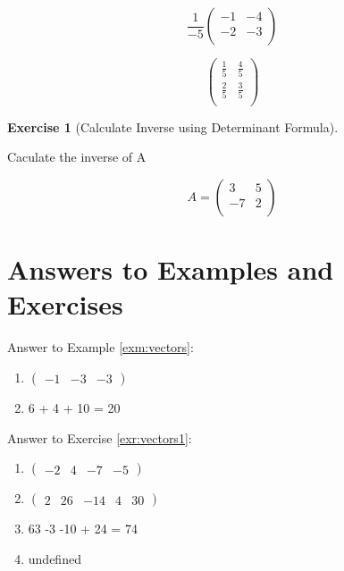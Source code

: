\documentclass[
]{book}
\providecommand{\tightlist}{%
  \setlength{\itemsep}{0pt}\setlength{\parskip}{0pt}}
\theoremstyle{definition}
\theoremstyle{definition}
\theoremstyle{definition}
\newtheorem{exercise}{Exercise}[chapter]
\theoremstyle{remark}
\begin{document}
\[\frac{1}{-5} \begin{pmatrix}
            -1 & -4\\
            -2 & -3\\
        \end{pmatrix}\]

\[ \begin{pmatrix}
            \frac{1}{5} & \frac{4}{5}\\
            \frac{2}{5} & \frac{3}{5}\\
        \end{pmatrix}\]

\begin{exercise}[Calculate Inverse using Determinant Formula]
\protect\hypertarget{exr:calcinverse}{}{\label{exr:calcinverse} {} }

Caculate the inverse of A

\[A = \begin{pmatrix}
            3 & 5\\
            -7 & 2\\
        \end{pmatrix}\]
\end{exercise}

\hypertarget{answers-to-examples-and-exercises-3}{%
\section*{Answers to Examples and Exercises}\label{answers-to-examples-and-exercises-3}}

Answer to Example \ref{exm:vectors}:

\begin{enumerate}
\def\labelenumi{\arabic{enumi}.}
\tightlist
\item
  \(\begin{pmatrix} -1 &-3&-3 \end{pmatrix}\)
\item
  6 + 4 + 10 = 20
\end{enumerate}

Answer to Exercise \ref{exr:vectors1}:

\begin{enumerate}
\def\labelenumi{\arabic{enumi}.}
\tightlist
\item
  \(\begin{pmatrix} -2 &4&-7&-5 \end{pmatrix}\)
\item
  \(\begin{pmatrix} 2 &26&-14&4&30 \end{pmatrix}\)
\item
  63 -3 -10 + 24 = 74
\item
  undefined
\end{enumerate}
\end{document}
